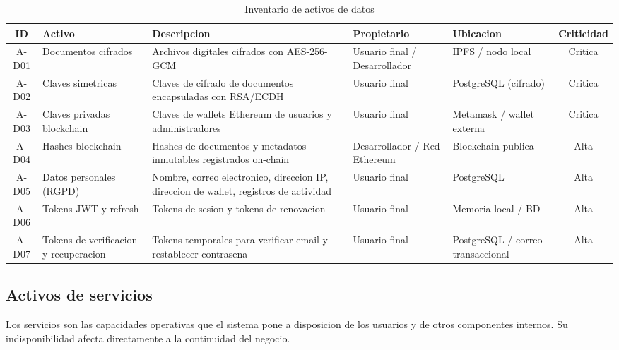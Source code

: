 \documentclass[11pt, a4paper]{article}
\begin{document}
\begin{table}[H]
\centering
\renewcommand{\arraystretch}{1.4}
\small
\begin{tabular}{|c|l|p{4.5cm}|l|l|c|}
\hline
\textbf{ID} & \textbf{Activo} & \textbf{Descripcion} & \textbf{Propietario} & \textbf{Ubicacion} & \textbf{Criticidad} \\
\hline
A-D01 & Documentos cifrados & Archivos digitales cifrados con AES-256-GCM & Usuario final / Desarrollador & IPFS / nodo local & Critica \\
\hline
A-D02 & Claves simetricas & Claves de cifrado de documentos encapsuladas con RSA/ECDH & Usuario final & PostgreSQL (cifrado) & Critica \\
\hline
A-D03 & Claves privadas blockchain & Claves de wallets Ethereum de usuarios y administradores & Usuario final & Metamask / wallet externa & Critica \\
\hline
A-D04 & Hashes blockchain & Hashes de documentos y metadatos inmutables registrados on-chain & Desarrollador / Red Ethereum & Blockchain publica & Alta \\
\hline
A-D05 & Datos personales (RGPD) & Nombre, correo electronico, direccion IP, direccion de wallet, registros de actividad & Usuario final & PostgreSQL & Alta \\
\hline
A-D06 & Tokens JWT y refresh & Tokens de sesion y tokens de renovacion & Usuario final & Memoria local / BD & Alta \\
\hline
A-D07 & Tokens de verificacion y recuperacion & Tokens temporales para verificar email y restablecer contrasena & Usuario final & PostgreSQL / correo transaccional & Alta \\
\hline
\end{tabular}
\caption{Inventario de activos de datos}
\label{tab:activos-datos}
\end{table}

\subsection{Activos de servicios}

Los servicios son las capacidades operativas que el sistema pone a disposicion de los usuarios y de otros componentes internos. Su indisponibilidad afecta directamente a la continuidad del negocio.
\end{document}
